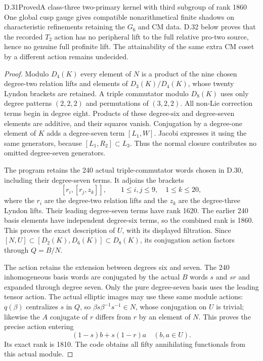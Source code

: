 \begin{statement}{D.31}{Proved}{A class-three two-primary kernel with third subgroup of rank 1860}
One global cusp gauge gives compatible nonarithmetical
finite shadows on characteristic refinements retaining
the $G_6$ and CM data. D.32 below proves that the
recorded $T_2$ action has no peripheral lift to the
full relative pro-two source, hence no genuine full
profinite lift. The attainability of the same extra
CM coset by a different action remains undecided.
\end{statement}
\begin{proof}
Modulo $D_4(K)$ every element of $N$ is a product of
the nine chosen degree-two relation lifts and elements
of $D_3(K)/D_4(K)$, whose twenty Lyndon brackets are
retained. A triple commutator modulo $D_8(K)$ uses
only degree patterns $(2,2,2)$ and permutations of
$(3,2,2)$. All non-Lie correction terms begin in degree
eight. Products of these degree-six and degree-seven
elements are additive, and their squares vanish.
Conjugation by a degree-one element of $K$ adds a
degree-seven term $[L_1,W]$. Jacobi expresses it using
the same generators, because $[L_1,R_2]\subset L_3$.
Thus the normal closure contributes no omitted
degree-seven generators.

The program retains the 240 actual triple-commutator
words chosen in D.30, including their degree-seven
terms. It adjoins the brackets
\[
       [r_i,[r_j,z_k]],\qquad
       1\leq i,j\leq9,\quad 1\leq k\leq20,            \tag{D.31.5}
\]
where the $r_i$ are the degree-two relation lifts and
the $z_k$ are the degree-three Lyndon lifts. Their
leading degree-seven terms have rank 1620. The earlier
240 basis elements have independent degree-six terms,
so the combined rank is 1860. This proves the exact
description of $U$, with its displayed filtration.
Since $[N,U]\subset[D_2(K),D_6(K)]\subset D_8(K)$,
its conjugation action factors through $Q=B/N$.

The action retains the extension between degrees six
and seven. The 240 inhomogeneous basis words are
conjugated by the actual $B$ words $s$ and $sr$ and
expanded through degree seven. Only the pure
degree-seven basis uses the leading tensor action.
The actual elliptic images may use these same module
actions: $q(\beta)$ centralizes $s$ in $Q$, so
$\beta s\beta^{-1}s^{-1}\in N$, whose conjugation on
$U$ is trivial; likewise the $A$ conjugate of $r$
differs from $r$ by an element of $N$.
This proves the precise action entering
\[
                 (1-s)b+s(1-r)a\quad(b,a\in U).        \tag{D.31.6}
\]
Its exact rank is 1810. The code obtains all fifty
annihilating functionals from this actual module.


\end{proof}
